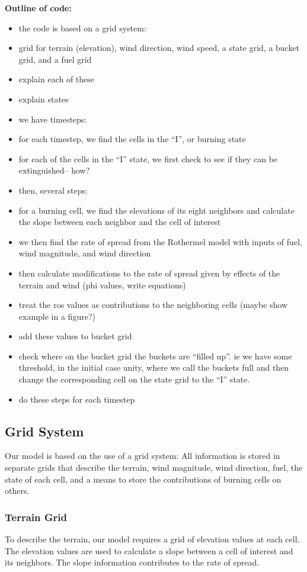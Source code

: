 \documentclass{article}
\begin{document}
{\bf Outline of code:}
\begin{itemize}
\item the code is based on a grid system:
\item grid for terrain (elevation), wind direction, wind speed, a state grid, a bucket grid, and a fuel grid
\item explain each of these
\item explain states
\item we have timesteps:
\item for each timestep, we find the cells in the ``I'', or burning state
\item for each of the cells in the ``I'' state, we first check to see if they can be extinguished-- how?
\item then, several steps:
\item for a burning cell, we find the elevations of its eight neighbors and calculate the slope between each neighbor and the cell of interest
\item we then find the rate of spread from the Rothermel model with inputs of fuel, wind magnitude, and wind direction
\item then calculate modifications to the rate of spread given by effects of the terrain and wind (phi values, write equations)
\item treat the ros values as contributions to the neighboring cells (maybe show example in a figure?)
\item add these values to bucket grid
\item check where on the bucket grid the buckets are ``filled up''. ie we have some threshold, in the initial case unity, where we call the buckets full and then change the corresponding cell on the state grid to the ``I'' state.
\item do these steps for each timestep
\end{itemize}


\subsection{Grid System}
Our model is based on the use of a grid system: All information is stored in separate grids that describe the terrain, wind magnitude, wind direction, fuel, the state of each cell, and a means to store the contributions of burning cells on others.

\subsubsection{Terrain Grid\label{sec:terraingrid}}
To describe the terrain, our model requires a grid of elevation values at each cell. The elevation values are used to calculate a slope between a cell of interest and its neighbors. The slope information contributes to the rate of spread. 
\end{document}
